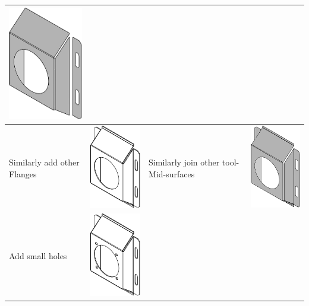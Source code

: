 \begin{longtable}{ L{0.18\textwidth} C{0.18\textwidth} L{0.38\textwidth}  C{0.18\textwidth}}
\includegraphics[scale=0.25]{..//Common/images//DryRun61.png} \\
\hline
Similarly add other Flanges  &
\includegraphics[scale=0.23]{..//Common/images//DryRun7.png} &
Similarly join other tool-Mid-surfaces &
\includegraphics[scale=0.23]{..//Common/images//DryRun71.png} \\
\hline
Add small holes &
\includegraphics[scale=0.23]{..//Common/images//DryRun8.png} &

\end{longtable}
